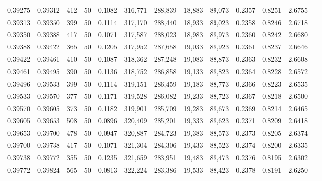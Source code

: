 \begin{tabular}{rrrrrrrrrrrrr}
0.39275 & 0.39312 &   412 &  50 &                                     0.1082 & 316,771 & 288,839 &  18,883 &  89,073 & 0.2357 & 0.8251 & 2.6755 \\
0.39313 & 0.39350 &   399 &  50 &                                     0.1114 & 317,170 & 288,440 &  18,933 &  89,023 & 0.2358 & 0.8246 & 2.6718 \\
0.39350 & 0.39388 &   417 &  50 &                                     0.1071 & 317,587 & 288,023 &  18,983 &  88,973 & 0.2360 & 0.8242 & 2.6680 \\
0.39388 & 0.39422 &   365 &  50 &                                     0.1205 & 317,952 & 287,658 &  19,033 &  88,923 & 0.2361 & 0.8237 & 2.6646 \\
0.39422 & 0.39461 &   410 &  50 &                                     0.1087 & 318,362 & 287,248 &  19,083 &  88,873 & 0.2363 & 0.8232 & 2.6608 \\
0.39461 & 0.39495 &   390 &  50 &                                     0.1136 & 318,752 & 286,858 &  19,133 &  88,823 & 0.2364 & 0.8228 & 2.6572 \\
0.39496 & 0.39533 &   399 &  50 &                                     0.1114 & 319,151 & 286,459 &  19,183 &  88,773 & 0.2366 & 0.8223 & 2.6535 \\
0.39533 & 0.39570 &   377 &  50 &                                     0.1171 & 319,528 & 286,082 &  19,233 &  88,723 & 0.2367 & 0.8218 & 2.6500 \\
0.39570 & 0.39605 &   373 &  50 &                                     0.1182 & 319,901 & 285,709 &  19,283 &  88,673 & 0.2369 & 0.8214 & 2.6465 \\
0.39605 & 0.39653 &   508 &  50 &                                     0.0896 & 320,409 & 285,201 &  19,333 &  88,623 & 0.2371 & 0.8209 & 2.6418 \\
0.39653 & 0.39700 &   478 &  50 &                                     0.0947 & 320,887 & 284,723 &  19,383 &  88,573 & 0.2373 & 0.8205 & 2.6374 \\
0.39700 & 0.39738 &   417 &  50 &                                     0.1071 & 321,304 & 284,306 &  19,433 &  88,523 & 0.2374 & 0.8200 & 2.6335 \\
0.39738 & 0.39772 &   355 &  50 &                                     0.1235 & 321,659 & 283,951 &  19,483 &  88,473 & 0.2376 & 0.8195 & 2.6302 \\
0.39772 & 0.39824 &   565 &  50 &                                     0.0813 & 322,224 & 283,386 &  19,533 &  88,423 & 0.2378 & 0.8191 & 2.6250 \\

\end{tabular}
